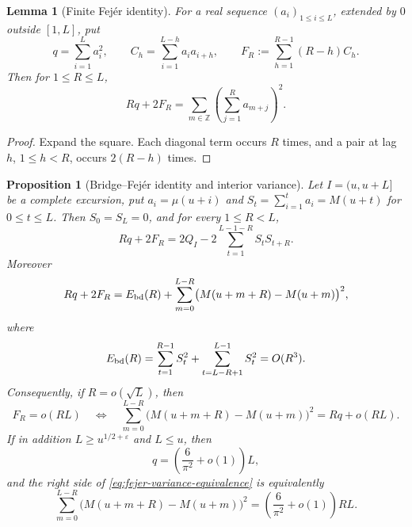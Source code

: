 \documentclass[11pt]{amsart}
\numberwithin{equation}{section}
\theoremstyle{plain}
\newtheorem{proposition}[theorem]{Proposition}
\newtheorem{lemma}[theorem]{Lemma}
\theoremstyle{definition}
\theoremstyle{remark}
\newcommand{\eps}{\varepsilon}
\begin{document}
\begin{lemma}[Finite Fej\'er identity]
\label{lem:fejer}
For a real sequence $(a_i)_{1\le i\le L}$, extended by $0$ outside
$[1,L]$, put
\[
q=\sum_{i=1}^La_i^2,
\qquad
C_h=\sum_{i=1}^{L-h}a_ia_{i+h},
\qquad
F_R:=\sum_{h=1}^{R-1}(R-h)C_h.
\]
Then for $1\le R\le L$,
\begin{equation}
\label{eq:fejer}
Rq+2F_R
=\sum_{m\in\mathbb Z}\left(\sum_{j=1}^{R}a_{m+j}\right)^2.
\end{equation}
\end{lemma}

\begin{proof}
Expand the square. Each diagonal term occurs $R$ times, and a pair at lag
$h$, $1\le h<R$, occurs $2(R-h)$ times.
\end{proof}

\begin{proposition}[Bridge--Fej\'er identity and interior variance]
\label{prop:bridge-fejer}
Let $I=(u,u+L]$ be a complete excursion, put
$a_i=\mu(u+i)$ and
$S_t=\sum_{i=1}^ta_i=M(u+t)$ for $0\le t\le L$. Then
$S_0=S_L=0$, and for every $1\le R<L$,
\begin{equation}
\label{eq:bridge-fejer-Q}
Rq+2F_R
=2Q_I-2\sum_{t=1}^{L-1-R}S_tS_{t+R}.
\end{equation}
Moreover
\begin{equation}
\label{eq:fejer-interior-boundary}
Rq+2F_R
=E_{\rm bd}(R)
+\sum_{m=0}^{L-R}\bigl(M(u+m+R)-M(u+m)\bigr)^2,
\end{equation}
where
\[
E_{\rm bd}(R)=\sum_{t=1}^{R-1}S_t^2
+\sum_{t=L-R+1}^{L-1}S_t^2
=O(R^3).
\]
Consequently, if $R=o(\sqrt L)$, then
\begin{equation}
\label{eq:fejer-variance-equivalence}
F_R=o(RL)
\quad\Longleftrightarrow\quad
\sum_{m=0}^{L-R}\bigl(M(u+m+R)-M(u+m)\bigr)^2
=Rq+o(RL).
\end{equation}
If in addition $L\ge u^{1/2+\eps}$ and $L\le u$, then
\begin{equation}
\label{eq:q-squarefree-local}
q=\left(\frac6{\pi^2}+o(1)\right)L,
\end{equation}
and the right side of \eqref{eq:fejer-variance-equivalence} is equivalently
\begin{equation}
\label{eq:local-variance-diagonal}
\sum_{m=0}^{L-R}\bigl(M(u+m+R)-M(u+m)\bigr)^2
=\left(\frac6{\pi^2}+o(1)\right)RL.
\end{equation}
\end{proposition}
\end{document}
